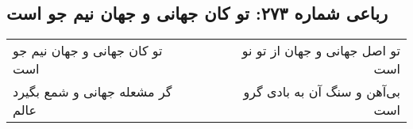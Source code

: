 \begin{center}
\section*{رباعی شماره ۲۷۳: تو کان جهانی و جهان نیم جو است}
\label{sec:0273}
\begin{longtable}{l p{0.5cm} r}
تو کان جهانی و جهان نیم جو است
&&
تو اصل جهانی و جهان از تو نو است
\\
گر مشعله جهانی و شمع بگیرد عالم
&&
بی‌آهن و سنگ آن به بادی گرو است
\\
\end{longtable}
\end{center}
